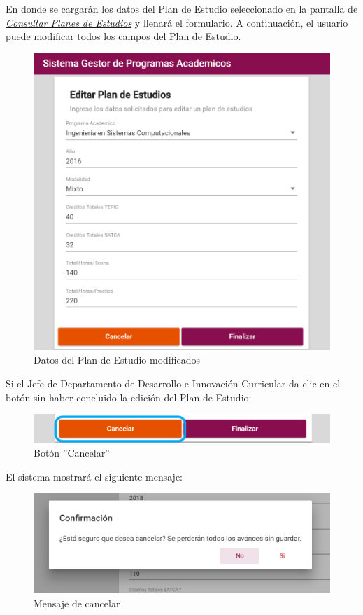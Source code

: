 En donde se cargarán los datos del Plan de Estudio seleccionado en la pantalla de \hyperlink{consultarPE}{\textit{Consultar Planes de Estudios}} y llenará el formulario.
\newpage
A continuación, el usuario puede modificar todos los campos del Plan de Estudio.
\begin{figure}[!hbtp]
	\centering
	\hypertarget{modif}{\includegraphics[width=0.7\linewidth]{images/SP4-GPE/editarPE1}}
	\caption{Datos del Plan de Estudio modificados}
	\label{modif}
\end{figure}

 Si el Jefe de Departamento de Desarrollo e Innovación Curricular da clic en el botón  sin haber concluido la edición del Plan de Estudio:

\begin{figure}[!hbtp]
	\centering
	\hypertarget{cancel2}{\includegraphics[width=0.7\linewidth]{images/SP4-GPE/cancelarPE}}
	\caption{Botón ''Cancelar''}
	\label{cancel2}
\end{figure}
\newpage

El sistema mostrará el siguiente mensaje:
\begin{figure}[!hbtp]
	\centering
	\hypertarget{ms1}{\includegraphics[width=0.7\linewidth]{images/SP4-GPE/m1}}
	\caption{Mensaje de cancelar}
	\label{ms1}
\end{figure}

